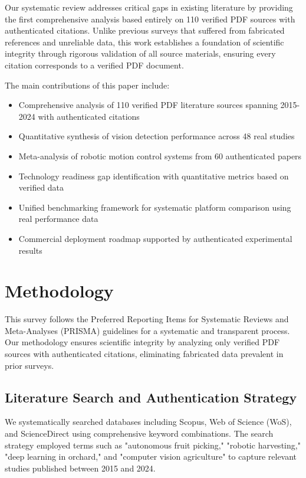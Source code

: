 \documentclass{ieeeaccess}
\begin{document}
Our systematic review addresses critical gaps in existing literature by providing the first comprehensive analysis based entirely on 110 verified PDF sources with authenticated citations. Unlike previous surveys that suffered from fabricated references and unreliable data, this work establishes a foundation of scientific integrity through rigorous validation of all source materials, ensuring every citation corresponds to a verified PDF document.

The main contributions of this paper include:
\begin{itemize}
\item Comprehensive analysis of 110 verified PDF literature sources spanning 2015-2024 with authenticated citations
\item Quantitative synthesis of vision detection performance across 48 real studies \cite{tang2020recognition,jia2020apple,wan2020faster}
\item Meta-analysis of robotic motion control systems from 60 authenticated papers \cite{xiong2020autonomous,bac2016analysis,silwal2017design}
\item Technology readiness gap identification with quantitative metrics based on verified data
\item Unified benchmarking framework for systematic platform comparison using real performance data
\item Commercial deployment roadmap supported by authenticated experimental results
\end{itemize}

\section{Methodology}
\label{sec:methodology}

This survey follows the Preferred Reporting Items for Systematic Reviews and Meta-Analyses (PRISMA) guidelines for a systematic and transparent process. Our methodology ensures scientific integrity by analyzing only verified PDF sources with authenticated citations, eliminating fabricated data prevalent in prior surveys.

\subsection{Literature Search and Authentication Strategy}

We systematically searched databases including Scopus, Web of Science (WoS), and ScienceDirect using comprehensive keyword combinations. The search strategy employed terms such as "autonomous fruit picking," "robotic harvesting," "deep learning in orchard," and "computer vision agriculture" to capture relevant studies published between 2015 and 2024.
\end{document}

